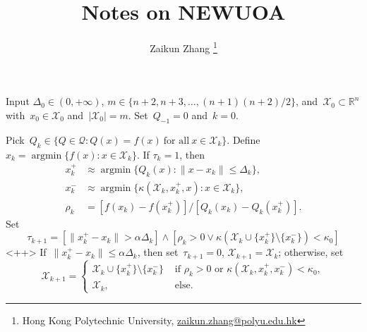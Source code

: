 \documentclass[12pt,a4paper,draft]{article}  %
\title{Notes on NEWUOA}
\date{\DTMnow}
\author{Zaikun Zhang
    \thanks{Hong Kong Polytechnic University, \url{zaikun.zhang@polyu.edu.hk}}
}
\theoremstyle{definition}
\numberwithin{equation}{section}
\DeclareMathOperator*{\argmin}{argmin}
\newcommand{\RR}{\mathbb{R}}
\newcommand{\Int}{\mathcal{X}}
\newcommand{\Qua}{\mathcal{Q}}
\begin{document}
\maketitle




\begin{algorithm}[htbp!]
    \caption{\label{alg:newuoa}}
    Input $\Delta_0\in (0,+\infty)$, $m\in \{n+2, n+3, \dots, (n+1)(n+2)/2\}$,
    and~$\Int_0\subset \RR^n$ with~$x_0\in \Int_0$ and~$|\Int_0|=m$. Set~$Q_{-1} = 0$ and~$k=0$.
    \begin{algorithmic}[1]
        \State Pick~$Q_k \in \{Q\in\Qua\mathrel{:} Q(x)=f(x)~\text{for all}~x\in\Int_k\}$.
        Define~$x_k = \argmin\{f(x) \mathrel{:} x\in \Int_k\}$.
        \State If  $\tau_k = 1$, then
            \begin{align}
            \label{eq:} x_k^+ &\approx \argmin\{Q_k(x)\mathrel{:} \|x-x_k\|\le \Delta_k\},\\
            \label{eq:} x_k^{-} &\approx \argmin\{\kappa(\Int_k, x_k^+, x) \mathrel{:} x \in \Int_k\},\\
            \label{eq:} \rho_k &= [f(x_k) - f(x_k^+)]/[Q_k(x_k) - Q_k(x_k^+)].
            \end{align}
            Set
            \begin{equation}
                \label{eq:}
                \tau_{k+1} = [\|x_k^{+}-x_k\| > \alpha\Delta_k] \land [\rho_k >0 \lor
                \kappa(\Int_k\cup\{x_k^+\}\setminus\{x_k^-\}) < \kappa_0]
            \end{equation}
            <++>
            If~$\|x_k^+-x_k\|\le \alpha \Delta_k$, then set~$\tau_{k+1} = 0$, $\Int_{k+1} = \Int_k$;
            otherwise, set
          \begin{equation}
              \label{eq:}
              \Int_{k+1} =
              \begin{cases}
                  \Int_k\cup\{x_k^+\}\setminus\{x_k^{-}\} & \text{ if } \rho_k>0 \text{ or
                  } \kappa(\Int_k, x_k^+,x_k^-)< \kappa_0,\\
                  \Int_k, & \text{ else}.
              \end{cases}
          \end{equation}

\end{algorithmic}
\end{algorithm}
\end{document}
